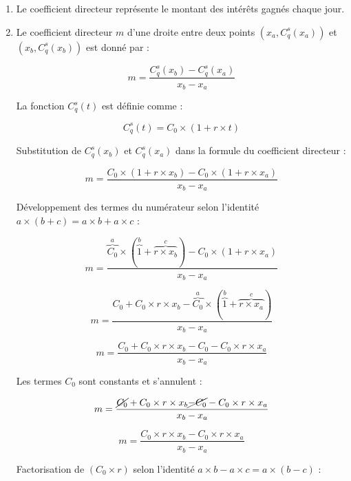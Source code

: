 \documentclass{article}
\begin{document}
\begin{enumerate}[label=\textbf{R1.\arabic*}]
    \item Le coefficient directeur représente le montant des intérêts gagnés chaque jour.
          
    \item Le coefficient directeur \( m \) d'une droite entre deux points \((x_a, C_q^s(x_a))\) et \((x_b, C_q^s(x_b))\) est donné par :
              
          \[
              m = \frac{C_q^s(x_b) - C_q^s(x_a)}{x_b - x_a}
          \]
              
          La fonction \( C_q^s(t) \) est définie comme :
              
          \[
              C_q^s(t) = C_0 \times \left(1 + r \times t\right)
          \]
                  
          Substitution de \( C_q^s(x_b) \) et \( C_q^s(x_a) \) dans la formule du coefficient directeur :
              
          \[
              m = \frac{C_0 \times \left(1 + r \times x_b\right) - C_0 \times \left(1 + r \times x_a\right)}{x_b - x_a}
          \]
              
          Développement des termes du numérateur selon l'identité $a \times (b + c) = a \times b + a \times c$ :
          
          \[
              m = \frac{\overset{a}{\overbrace{C_0}} \times (\overset{b}{\overbrace{1}} + \overset{c}{\overbrace{r \times x_b}}) - C_0 \times (1 + r \times x_a)}{x_b - x_a}
          \]
          
          \[
              m = \frac{C_0 + C_0 \times r \times x_b - \overset{a}{\overbrace{C_0}} \times (\overset{b}{\overbrace{1}} + \overset{c}{\overbrace{r \times x_a}})}{x_b - x_a}
          \]
              
          \[
              m = \frac{C_0 + C_0 \times r \times x_b - C_0 - C_0 \times r \times x_a}{x_b - x_a}
          \]
              
          Les termes \( C_0 \) sont constants et s'annulent :
          
          \[
              m = \frac{\cancel{C_0} + C_0 \times r \times x_b \cancel{- C_0} - C_0 \times r \times x_a}{x_b - x_a}
          \]
              
          \[
              m = \frac{C_0 \times r \times x_b - C_0 \times r \times x_a}{x_b - x_a}
          \]
              
          Factorisation de $(C_0 \times r)$ selon l'identité $a \times b - a \times c = a \times (b-c)$ :
          

\end{enumerate}
\end{document}
